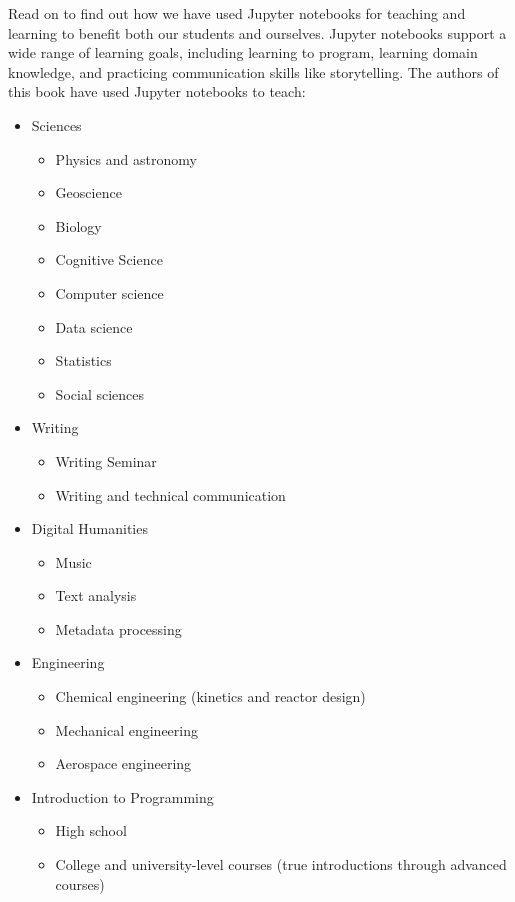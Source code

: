 \documentclass[]{book}
\providecommand{\tightlist}{%
  \setlength{\itemsep}{0pt}\setlength{\parskip}{0pt}}
\begin{document}
Read on to find out how we have used Jupyter notebooks for teaching and learning
to benefit both our students and ourselves. Jupyter notebooks support a wide
range of learning goals, including learning to program, learning domain
knowledge, and practicing communication skills like storytelling. The authors of
this book have used Jupyter notebooks to teach:

\begin{itemize}
\tightlist
\item
  Sciences

  \begin{itemize}
  \tightlist
  \item
    Physics and astronomy
  \item
    Geoscience
  \item
    Biology
  \item
    Cognitive Science
  \item
    Computer science
  \item
    Data science
  \item
    Statistics
  \item
    Social sciences
  \end{itemize}
\item
  Writing

  \begin{itemize}
  \tightlist
  \item
    Writing Seminar
  \item
    Writing and technical communication
  \end{itemize}
\item
  Digital Humanities

  \begin{itemize}
  \tightlist
  \item
    Music
  \item
    Text analysis
  \item
    Metadata processing
  \end{itemize}
\item
  Engineering

  \begin{itemize}
  \tightlist
  \item
    Chemical engineering (kinetics and reactor design)
  \item
    Mechanical engineering
  \item
    Aerospace engineering
  \end{itemize}
\item
  Introduction to Programming

  \begin{itemize}
  \tightlist
  \item
    High school
  \item
    College and university-level courses (true introductions through advanced courses)
  \end{itemize}
\end{itemize}
\end{document}
